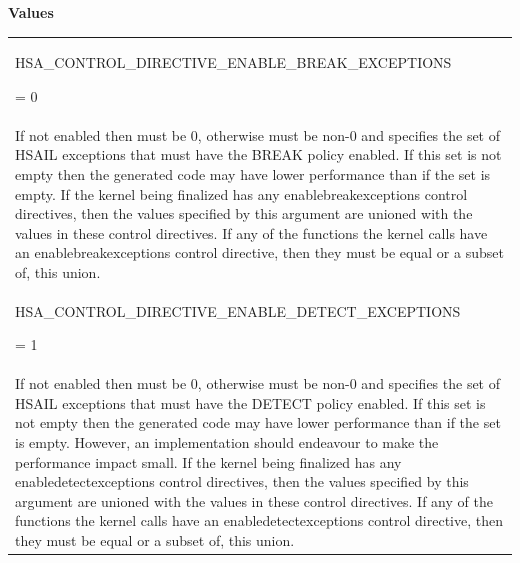 \documentclass[final]{book}
\newcommand{\reftyp}[1]{#1}
\newcommand{\refenu}[1]{\reftyp{#1}}
\begin{document}
\begin{appendices}
\noindent\textbf{Values}\\[-5mm]
\begin{longtable}{@{\hspace{2em}}p{\linewidth-2em}}
\hspace{-2em}\hypertarget{group--FinalizerCoreApi-1ggac86e8f3e8ccba532765320c93b18ac95a35cab6fa9b8f2c6416f2ef2f2c70fce5}{\refenu{HSA_CONTROL_DIRECTIVE_ENABLE_BREAK_EXCEPTIONS}} = 0\\If not enabled then must be 0, otherwise must be non-0 and specifies the set of HSAIL exceptions that must have the BREAK policy enabled. If this set is not empty then the generated code may have lower performance than if the set is empty. If the kernel being finalized has any enablebreakexceptions control directives, then the values specified by this argument are unioned with the values in these control directives. If any of the functions the kernel calls have an enablebreakexceptions control directive, then they must be equal or a subset of, this union.\\[2mm]
\hspace{-2em}\hypertarget{group--FinalizerCoreApi-1ggac86e8f3e8ccba532765320c93b18ac95a6222105217594a165e26d7b07fffd68a}{\refenu{HSA_CONTROL_DIRECTIVE_ENABLE_DETECT_EXCEPTIONS}} = 1\\If not enabled then must be 0, otherwise must be non-0 and specifies the set of HSAIL exceptions that must have the DETECT policy enabled. If this set is not empty then the generated code may have lower performance than if the set is empty. However, an implementation should endeavour to make the performance impact small. If the kernel being finalized has any enabledetectexceptions control directives, then the values specified by this argument are unioned with the values in these control directives. If any of the functions the kernel calls have an enabledetectexceptions control directive, then they must be equal or a subset of, this union.\\[2mm]

\end{longtable}
\end{appendices}
\end{document}
